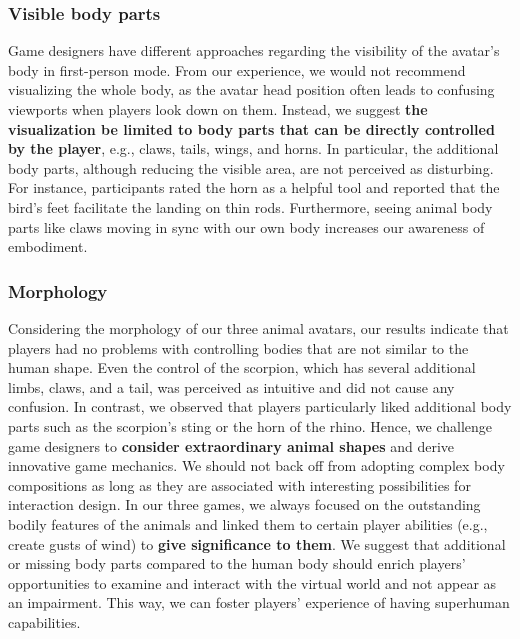 \documentclass{sigchi}
\begin{document}
\subsubsection{Visible body parts}
Game designers have different approaches regarding the visibility of the avatar's body in first-person mode. From our experience, we would not recommend visualizing the whole body, as the avatar head position often leads to confusing viewports when players look down on them. Instead, we suggest \textbf{the visualization be limited to body parts that can be directly controlled by the player}, e.g., claws, tails, wings, and horns. In particular, the additional body parts, although reducing the visible area, are not perceived as disturbing. For instance, participants rated the horn as a helpful tool and reported that the bird's feet facilitate the landing on thin rods. Furthermore, seeing animal body parts like claws moving in sync with our own body increases our awareness of embodiment. 

\subsubsection{Morphology}
Considering the morphology of our three animal avatars, our results indicate that players had no problems with controlling bodies that are not similar to the human shape. Even the control of the scorpion, which has several additional limbs, claws, and a tail, was perceived as intuitive and did not cause any confusion.
In contrast, we observed that players particularly liked additional body parts such as the scorpion's sting or the horn of the rhino. 
Hence, we challenge game designers to \textbf{consider extraordinary animal shapes} and derive innovative game mechanics. We should not back off from adopting complex body compositions as long as they are associated with interesting possibilities for interaction design.
In our three games, we always focused on the outstanding bodily features of the animals and linked them to certain player abilities (e.g., create gusts of wind) to \textbf{give significance to them}. 
We suggest that additional or missing body parts compared to the human body should enrich players' opportunities to examine and interact with the virtual world and not appear as an impairment. This way, we can foster players' experience of having superhuman capabilities.
\end{document}
